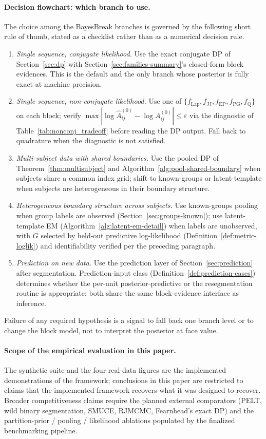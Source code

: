 \paragraph{Decision flowchart: which branch to use.}
The choice among the BayesBreak branches is governed by the following short rule of thumb,
stated as a checklist rather than as a numerical decision rule.
\begin{enumerate}[label=(\arabic*), leftmargin=2.3em]
\item \emph{Single sequence, conjugate likelihood.} Use the exact conjugate DP of
Section~\ref{sec:dp} with Section~\ref{sec:families-summary}'s closed-form block evidences.
This is the default and the only branch whose posterior is fully exact at machine precision.
\item \emph{Single sequence, non-conjugate likelihood.} Use one of
$\{f_{\mathrm{Lap}},f_{\mathrm{JJ}},f_{\mathrm{EP}},f_{\mathrm{PG}},f_{\mathrm{Q}}\}$ on each
block; verify $\max|\log\widehat A^{(0)}_{ij}-\log A^{(0)}_{ij}|\le\varepsilon$ via the
diagnostic of Table~\ref{tab:nonconj_tradeoff} before reading the DP output. Fall back to
quadrature when the diagnostic is not satisfied.
\item \emph{Multi-subject data with shared boundaries.} Use the pooled DP of
Theorem~\ref{thm:multisubject} and Algorithm~\ref{alg:pool-shared-boundary} when subjects share
a common index grid; shift to known-groups or latent-template when subjects are heterogeneous in
their boundary structure.
\item \emph{Heterogeneous boundary structure across subjects.} Use known-groups pooling when
group labels are observed (Section~\ref{sec:groups-known}); use latent-template EM
(Algorithm~\ref{alg:latent-em-detail}) when labels are unobserved, with $G$ selected by
held-out predictive log-likelihood (Definition~\ref{def:metric-loglik}) and identifiability
verified per the preceding paragraph.
\item \emph{Prediction on new data.} Use the prediction layer of Section~\ref{sec:prediction}
after segmentation. Prediction-input class (Definition~\ref{def:prediction-cases}) determines
whether the per-unit posterior-predictive or the resegmentation routine is appropriate; both
share the same block-evidence interface as inference.
\end{enumerate}
Failure of any required hypothesis is a signal to fall back one branch level or to change the
block model, not to interpret the posterior at face value.

\paragraph{Scope of the empirical evaluation in this paper.}
The synthetic suite and the four real-data figures are the implemented demonstrations of the
framework; conclusions in this paper are restricted to claims that the implemented framework
recovers what it was designed to recover. Broader competitiveness claims require the planned
external comparators (PELT, wild binary segmentation, SMUCE, RJMCMC, Fearnhead's exact DP) and
the partition-prior / pooling / likelihood ablations populated by the finalized benchmarking
pipeline.
